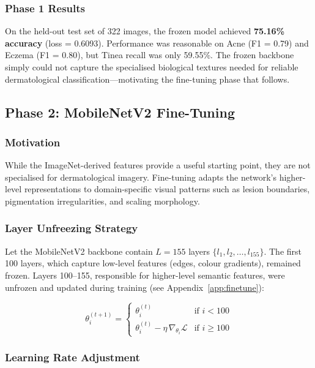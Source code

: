 \subsubsection{Phase 1 Results}

On the held-out test set of 322 images, the frozen model achieved \textbf{75.16\% accuracy} (loss = 0.6093). Performance was reasonable on Acne (F1 = 0.79) and Eczema (F1 = 0.80), but Tinea recall was only 59.55\%. The frozen backbone simply could not capture the specialised biological textures needed for reliable dermatological classification---motivating the fine-tuning phase that follows.


\subsection{Phase 2: MobileNetV2 Fine-Tuning}
\label{sec:phase2}

\subsubsection{Motivation}

While the ImageNet-derived features provide a useful starting point, they are not specialised for dermatological imagery. Fine-tuning adapts the network's higher-level representations to domain-specific visual patterns such as lesion boundaries, pigmentation irregularities, and scaling morphology.

\subsubsection{Layer Unfreezing Strategy}

Let the MobileNetV2 backbone contain $L = 155$ layers $\{l_1, l_2, \ldots, l_{155}\}$. The first 100 layers, which capture low-level features (edges, colour gradients), remained frozen. Layers 100--155, responsible for higher-level semantic features, were unfrozen and updated during training (see Appendix~\ref{app:finetune}):

\[
\theta_i^{(t+1)} =
\begin{cases}
\theta_i^{(t)} & \text{if } i < 100 \\
\theta_i^{(t)} - \eta \,\nabla_{\theta_i}\mathcal{L} & \text{if } i \geq 100
\end{cases}
\]

\subsubsection{Learning Rate Adjustment}


